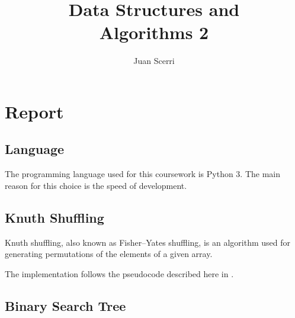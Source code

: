 \documentclass[article]{uom-coursework}
\title{Data Structures and\\Algorithms 2}
\author{Juan Scerri}
\begin{document}

\pagestyle{umpage}

\frontmatter

\maketitle %

\tableofcontents %

\clearpage

\lstlistoflistings

\clearpage

\mainmatter


\chapter*{Report}
\label{chap:report}

\section{Language}

The programming language used for this coursework is Python 3.
The main reason for this choice is the speed of development.

\section{Knuth Shuffling}



Knuth shuffling, also known as Fisher--Yates shuffling, is an
algorithm used for generating permutations of the elements of a
given array.

The implementation follows the pseudocode described here in
\textcite{wikifisheryates}.

\section{Binary Search Tree}
\end{document}
